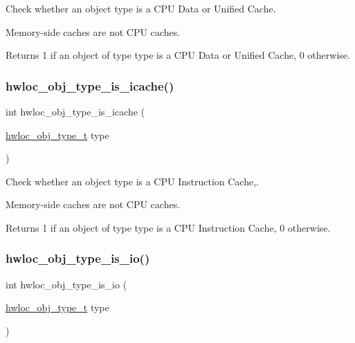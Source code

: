 Check whether an object type is a C\+PU Data or Unified Cache. 

Memory-\/side caches are not C\+PU caches.

\begin{DoxyReturn}{Returns}
1 if an object of type {\ttfamily type} is a C\+PU Data or Unified Cache, 0 otherwise. 
\end{DoxyReturn}
\mbox{\label{a00198_ga8abcee67b9b074332c1866405a3648a9}} 
\subsubsection{\texorpdfstring{hwloc\+\_\+obj\+\_\+type\+\_\+is\+\_\+icache()}{hwloc\_obj\_type\_is\_icache()}}
{\footnotesize\ttfamily int hwloc\+\_\+obj\+\_\+type\+\_\+is\+\_\+icache (\begin{DoxyParamCaption}\item[{\hyperlink{a00184_gacd37bb612667dc437d66bfb175a8dc55}{hwloc\+\_\+obj\+\_\+type\+\_\+t}}]{type }\end{DoxyParamCaption})}



Check whether an object type is a C\+PU Instruction Cache,. 

Memory-\/side caches are not C\+PU caches.

\begin{DoxyReturn}{Returns}
1 if an object of type {\ttfamily type} is a C\+PU Instruction Cache, 0 otherwise. 
\end{DoxyReturn}
\mbox{\label{a00198_gac8a954ed37a4376097234c828068cbef}} 
\subsubsection{\texorpdfstring{hwloc\+\_\+obj\+\_\+type\+\_\+is\+\_\+io()}{hwloc\_obj\_type\_is\_io()}}
{\footnotesize\ttfamily int hwloc\+\_\+obj\+\_\+type\+\_\+is\+\_\+io (\begin{DoxyParamCaption}\item[{\hyperlink{a00184_gacd37bb612667dc437d66bfb175a8dc55}{hwloc\+\_\+obj\+\_\+type\+\_\+t}}]{type }\end{DoxyParamCaption})}



